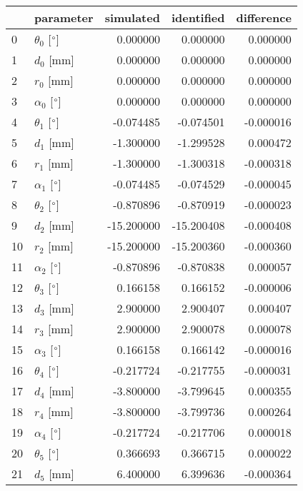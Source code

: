 \documentclass{standalone}%
\begin{document}
%
\normalsize%
\begin{tabular}{llrrr}
\toprule
{} &                 parameter &  simulated & identified & difference \\
\midrule
0  &  $\theta_{0}$ [$\degree$] &   0.000000 &   0.000000 &   0.000000 \\
1  &              $d_{0}$ [mm] &   0.000000 &   0.000000 &   0.000000 \\
2  &              $r_{0}$ [mm] &   0.000000 &   0.000000 &   0.000000 \\
3  &  $\alpha_{0}$ [$\degree$] &   0.000000 &   0.000000 &   0.000000 \\
4  &  $\theta_{1}$ [$\degree$] &  -0.074485 &  -0.074501 &  -0.000016 \\
5  &              $d_{1}$ [mm] &  -1.300000 &  -1.299528 &   0.000472 \\
6  &              $r_{1}$ [mm] &  -1.300000 &  -1.300318 &  -0.000318 \\
7  &  $\alpha_{1}$ [$\degree$] &  -0.074485 &  -0.074529 &  -0.000045 \\
8  &  $\theta_{2}$ [$\degree$] &  -0.870896 &  -0.870919 &  -0.000023 \\
9  &              $d_{2}$ [mm] & -15.200000 & -15.200408 &  -0.000408 \\
10 &              $r_{2}$ [mm] & -15.200000 & -15.200360 &  -0.000360 \\
11 &  $\alpha_{2}$ [$\degree$] &  -0.870896 &  -0.870838 &   0.000057 \\
12 &  $\theta_{3}$ [$\degree$] &   0.166158 &   0.166152 &  -0.000006 \\
13 &              $d_{3}$ [mm] &   2.900000 &   2.900407 &   0.000407 \\
14 &              $r_{3}$ [mm] &   2.900000 &   2.900078 &   0.000078 \\
15 &  $\alpha_{3}$ [$\degree$] &   0.166158 &   0.166142 &  -0.000016 \\
16 &  $\theta_{4}$ [$\degree$] &  -0.217724 &  -0.217755 &  -0.000031 \\
17 &              $d_{4}$ [mm] &  -3.800000 &  -3.799645 &   0.000355 \\
18 &              $r_{4}$ [mm] &  -3.800000 &  -3.799736 &   0.000264 \\
19 &  $\alpha_{4}$ [$\degree$] &  -0.217724 &  -0.217706 &   0.000018 \\
20 &  $\theta_{5}$ [$\degree$] &   0.366693 &   0.366715 &   0.000022 \\
21 &              $d_{5}$ [mm] &   6.400000 &   6.399636 &  -0.000364 \\

\end{tabular}
\end{document}
